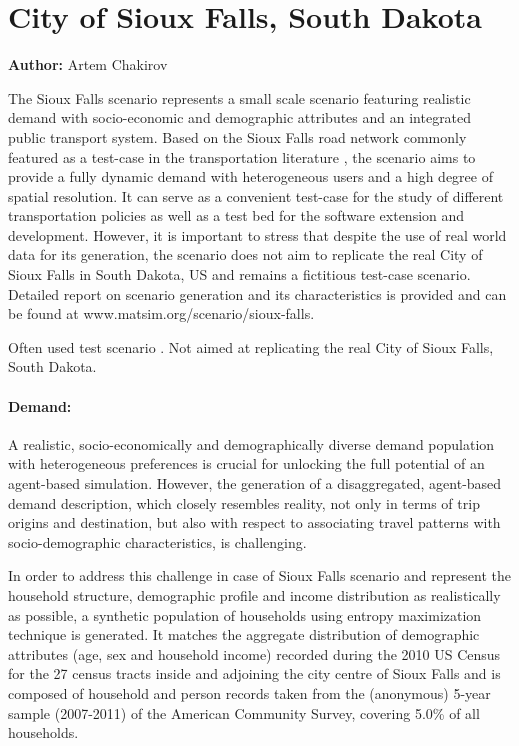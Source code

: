 \section{City of Sioux Falls, South Dakota}
\label{ch:scenarios:siouxfalls}
\hfill \textbf{Author:} Artem Chakirov

The Sioux Falls scenario represents a small scale scenario featuring realistic demand with socio-economic and demographic attributes and an integrated public transport system. Based on the  Sioux Falls road network commonly featured as a test-case in the transportation literature \citep[][]{BarGera_TNTP_Webpage_2013}, the scenario aims to provide a fully dynamic demand with heterogeneous users and a high degree of spatial resolution. It can serve as a convenient test-case for the study of different transportation policies as well as a test bed for the software extension and development. However, it is important to stress that despite the use of real world data for its generation, the scenario does not aim to replicate the real City of Sioux Falls in South Dakota, US and remains a fictitious test-case scenario. Detailed report on scenario generation and its characteristics is provided \citet[][]{ChakirovFourie_TechRep_FCL_2014} and can be found at www.matsim.org/scenario/sioux-falls. 

Often used test scenario . Not aimed at replicating the real City of Sioux Falls, South Dakota.

\paragraph{Demand:}

A realistic, socio-economically and demographically diverse demand population with  heterogeneous preferences is crucial for unlocking the full potential of an agent-based simulation. However, the generation of a disaggregated, agent-based demand description, which closely resembles reality, not only in terms of trip origins and destination, but also with respect to associating travel patterns with socio-demographic characteristics, is challenging.

In order to address this challenge in case of Sioux Falls scenario and represent the household structure, demographic profile and income distribution as realistically as possible, a synthetic population of households using entropy maximization technique is generated. It matches the aggregate distribution of demographic attributes (age, sex and household income) recorded during the 2010 US Census for the 27 census tracts inside and adjoining the city centre of Sioux Falls and is composed of household and person records taken from the (anonymous) 5-year sample (2007-2011) of the American Community Survey, covering 5.0\% of all households.

